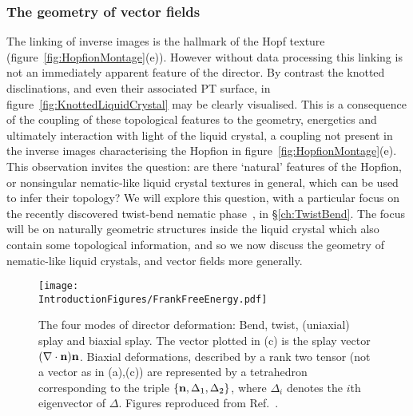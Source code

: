 \subsubsection{The geometry of vector fields}
\label{subsec:Geometry}
The linking of inverse images is the hallmark of the Hopf texture (figure~\ref{fig:HopfionMontage}(e)). However without data processing this linking is not an immediately apparent feature of the director. By contrast the knotted disclinations, and even their associated PT surface, in figure~\ref{fig:KnottedLiquidCrystal} may be clearly visualised. This is a consequence of the coupling of these topological features to the geometry, energetics and ultimately interaction with light of the liquid crystal, a coupling not present in the inverse images characterising the Hopfion in figure~\ref{fig:HopfionMontage}(e). This observation invites the question: are there `natural' features of the Hopfion, or nonsingular nematic-like liquid crystal textures in general, which can be used to infer their topology? We will explore this question, with a particular focus on the recently discovered twist-bend nematic phase~\citep{Lavrentovich2018}, in \S\ref{ch:TwistBend}. The focus will be on naturally geometric structures inside the liquid crystal which also contain some topological information, and so we now discuss the geometry of nematic-like liquid crystals, and vector fields more generally. 
\begin{figure}[htbp]
\centering
\texttt{[image: \\IntroductionFigures/FrankFreeEnergy.pdf]}
\caption{The four modes of director deformation: Bend, twist, (uniaxial) splay and biaxial splay. The vector plotted in (c) is the splay vector $(\nabla \cdot {\bf n}) \bf n$. Biaxial deformations, described by a rank two tensor (not a vector as in (a),(c)) are represented by a tetrahedron corresponding to the triple $\{{\bf n},\Delta_1, \Delta_2\}$, where $\Delta_i$ denotes the $i$th eigenvector of $\Delta$. Figures reproduced from Ref.~\citep{Selinger2019}. }
\label{fig:FrankFreeEnergy}
\end{figure}

